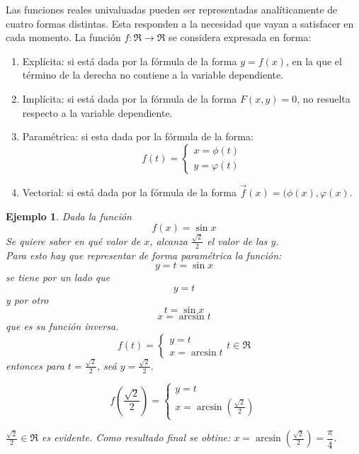 \documentclass[10pt,twoside]{SelfArx} %
\begin{document}
 Las funciones reales univaluadas pueden ser representadas anal\'iticamente de cuatro formas distintas. Esta responden a la necesidad que vayan a satisfacer en cada momento.
\label{formas_expresar_func}
La función $ f:\Re \rightarrow \Re $ se considera expresada en forma:\\
\begin{enumerate}
	\item Explícita: si está dada por la fórmula de la forma $ y=f(x) $, en la que el término de la derecha no contiene a la variable dependiente.
	
	\item Implícita: si está dada por la fórmula de la forma $ F(x,y)=0 $, no resuelta respecto a la variable dependiente.
	\item Paramétrica: si esta dada por la fórmula de la forma:
	\[ f(t)=\begin{cases}
		x=\phi (t)\\
		y=\varphi(t)
		\end{cases} \]
	\item 	Vectorial: si está dada por la fórmula de la forma $ \vec{f}(x)=(\phi(x),\varphi(x) $.
	
	
\end{enumerate}

\newtheorem{ejemplo}{Ejemplo}
\begin{ejemplo}
	Dada la funci\'on 
	\[ f(x)=\sin x \]
	Se quiere saber en qu\'e valor  de $ x $, alcanza $ \frac{\sqrt{2}}{2} $ el valor de las $ y $.\\
	Para esto hay que representar de forma param\'etrica la funci\'on:
	\[ y=t=\sin x \]
	se tiene por un lado que
	\[ y=t \]
	y por otro
	\[ t=\sin x \]
	\[ x=\arcsin t \]
	que es su funci\'on inversa.
	\[ 
	f(t)=
	\begin{cases}
	y=t\\
	x=\arcsin t
	\end{cases}
	t\in \Re
	 \]
	 entonces para $ t=\frac{\sqrt{2}}{2} $, se\'a $ y= \frac{\sqrt{2}}{2} $.
	 
	 
	 	\[ 
	 	f\left (\frac{\sqrt{2}}{2}\right )=
	 	\begin{cases}
	 	y=t\\
	 	x=\arcsin \left (\frac{\sqrt{2}}{2}\right )
	
	 	\end{cases}
	 	\] 	

	 $ 	\frac{\sqrt{2}}{2}\in \Re  $ es evidente.
	 Como resultado final se obtine: $ x=\arcsin \left (\frac{\sqrt{2}}{2}\right )=\dfrac{\pi}{4} $.
\end{ejemplo}
\end{document}
